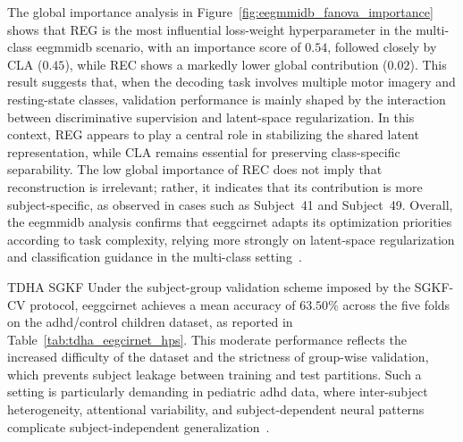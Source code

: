 {The global importance analysis in Figure~\ref{fig:eegmmidb_fanova_importance} shows that REG is the most influential loss-weight hyperparameter in the multi-class \gls{eegmmidb} scenario, with an importance score of $0.54$, followed closely by CLA ($0.45$), while REC shows a markedly lower global contribution ($0.02$). This result suggests that, when the decoding task involves multiple motor imagery and resting-state classes, validation performance is mainly shaped by the interaction between discriminative supervision and latent-space regularization. In this context, REG appears to play a central role in stabilizing the shared latent representation, while CLA remains essential for preserving class-specific separability. The low global importance of REC does not imply that reconstruction is irrelevant; rather, it indicates that its contribution is more subject-specific, as observed in cases such as Subject~41 and Subject~49. Overall, the \gls{eegmmidb} analysis confirms that \gls{eeggcirnet} adapts its optimization priorities according to task complexity, relying more strongly on latent-space regularization and classification guidance in the multi-class setting~\cite{lotte2018review,saha2020intra}.}

TDHA SGKF Under the subject-group validation scheme imposed by the SGKF-CV protocol, \gls{eeggcirnet} achieves a mean accuracy of $63.50\%$ across the five folds on the \gls{adhd}/control children dataset, as reported in Table~\ref{tab:tdha_eegcirnet_hps}. This moderate performance reflects the increased difficulty of the dataset and the strictness of group-wise validation, which prevents subject leakage between training and test partitions. Such a setting is particularly demanding in pediatric \gls{adhd} data, where inter-subject heterogeneity, attentional variability, and subject-dependent neural patterns complicate subject-independent generalization~\cite{lotte2018review,saha2020intra}.

